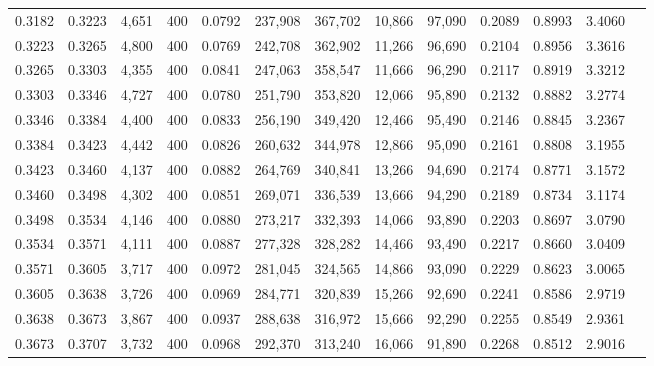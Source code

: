 \begin{tabular}{rrrrrrrrrrrrr}
0.3182 & 0.3223 &  4,651 & 400 &                                     0.0792 & 237,908 & 367,702 &  10,866 &  97,090 & 0.2089 & 0.8993 & 3.4060 \\
0.3223 & 0.3265 &  4,800 & 400 &                                     0.0769 & 242,708 & 362,902 &  11,266 &  96,690 & 0.2104 & 0.8956 & 3.3616 \\
0.3265 & 0.3303 &  4,355 & 400 &                                     0.0841 & 247,063 & 358,547 &  11,666 &  96,290 & 0.2117 & 0.8919 & 3.3212 \\
0.3303 & 0.3346 &  4,727 & 400 &                                     0.0780 & 251,790 & 353,820 &  12,066 &  95,890 & 0.2132 & 0.8882 & 3.2774 \\
0.3346 & 0.3384 &  4,400 & 400 &                                     0.0833 & 256,190 & 349,420 &  12,466 &  95,490 & 0.2146 & 0.8845 & 3.2367 \\
0.3384 & 0.3423 &  4,442 & 400 &                                     0.0826 & 260,632 & 344,978 &  12,866 &  95,090 & 0.2161 & 0.8808 & 3.1955 \\
0.3423 & 0.3460 &  4,137 & 400 &                                     0.0882 & 264,769 & 340,841 &  13,266 &  94,690 & 0.2174 & 0.8771 & 3.1572 \\
0.3460 & 0.3498 &  4,302 & 400 &                                     0.0851 & 269,071 & 336,539 &  13,666 &  94,290 & 0.2189 & 0.8734 & 3.1174 \\
0.3498 & 0.3534 &  4,146 & 400 &                                     0.0880 & 273,217 & 332,393 &  14,066 &  93,890 & 0.2203 & 0.8697 & 3.0790 \\
0.3534 & 0.3571 &  4,111 & 400 &                                     0.0887 & 277,328 & 328,282 &  14,466 &  93,490 & 0.2217 & 0.8660 & 3.0409 \\
0.3571 & 0.3605 &  3,717 & 400 &                                     0.0972 & 281,045 & 324,565 &  14,866 &  93,090 & 0.2229 & 0.8623 & 3.0065 \\
0.3605 & 0.3638 &  3,726 & 400 &                                     0.0969 & 284,771 & 320,839 &  15,266 &  92,690 & 0.2241 & 0.8586 & 2.9719 \\
0.3638 & 0.3673 &  3,867 & 400 &                                     0.0937 & 288,638 & 316,972 &  15,666 &  92,290 & 0.2255 & 0.8549 & 2.9361 \\
0.3673 & 0.3707 &  3,732 & 400 &                                     0.0968 & 292,370 & 313,240 &  16,066 &  91,890 & 0.2268 & 0.8512 & 2.9016 \\

\end{tabular}

